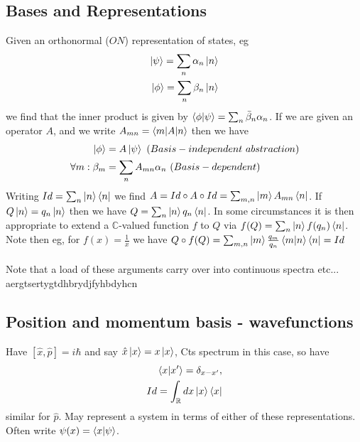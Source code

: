 \documentclass{article}
\begin{document}
\subsection{Bases and Representations}
Given an orthonormal ($ON$) representation of states, eg
\begin{align*}
  \ket\psi=\sum_n\alpha_n\ket n
  \\
  \ket\phi=\sum_n\beta_n\ket n
\end{align*}
we find that the inner product is given by $\braket{\phi|\psi}=\sum_n\bar\beta_n\alpha_n$.  If we are given an operator $A$, and we write $A_{mn}=\braket{m|A|n}$ then we have
\begin{align*}
  \ket \phi&=A\ket\psi~(Basis-independent~abstraction)
  \\
  \forall m :\beta_m&=\sum_nA_{mn}\alpha_n~(Basis-dependent)
\end{align*}
Writing $Id=\sum_n\ket n\bra n$ we find $A=Id\circ A\circ Id=\sum_{m,n}\ket mA_{mn}\bra{n}$.  If $Q\ket n =q_n \ket n$ then we have $Q=\sum_n \ket n q_n \bra n$.  In some circumstances it is then appropriate to extend a $\mathbb C $-valued function $f$ to $Q$ via $f(Q)=\sum_n \ket n f(q_n) \bra n$.  Note then eg, for $f(x)=\frac{1}{x}$ we have $Q\circ f(Q)=\sum_{m,n}\ket m \frac{q_m}{q_n}\braket{m|n}\bra n=Id$
\\
\\
Note that a load of these arguments carry over into continuous spectra etc... aergtsertygtdhbrydjfyhbdyhcn
\subsection{Position and momentum basis - wavefunctions}
Have $[\hat x,\hat p]=i\hbar$ and say $\hat x\ket x=x\ket x$,  Cts spectrum in this case, so have
\begin{align*}
  \braket{x|x'}=\delta_{x-x'},
  \\
  Id=\int_\mathbb{R}dx\ket x \bra x
\end{align*}
similar for $\hat p$.  May represent a system in terms of either of these representations.  Often write $\psi(x)=\braket{x|\psi}$.
\end{document}
